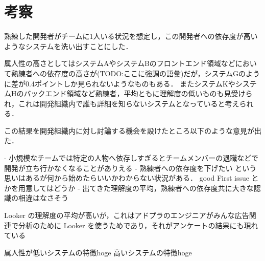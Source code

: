 \section{考察}

熟練した開発者がチームに1人いる状況を想定し，この開発者への依存度が高いようなシステムを洗い出すことにした．



属人性の高さとしてはシステムAやシステムBのフロントエンド領域などにおいて熟練者への依存度の高さが(TODO:ここに強調の語彙)だが，システムGのように差が0.4ポイントしか見られないようなものもある．
またシステムKやシステムHのバックエンド領域など熟練者，平均ともに理解度の低いものも見受けられ，これは開発組織内で誰も詳細を知らないシステムとなっていると考えられる．

この結果を開発組織内に対し討論する機会を設けたところ以下のような意見が出た．

- 小規模なチームでは特定の人物へ依存しすぎるとチームメンバーの退職などで開発が立ち行かなくなることがありえる
- 熟練者への依存度を下げたい という思いはあるが何から始めたらいいかわからない状況がある． good First issue とかを用意してはどうか
- 出てきた理解度の平均，熟練者への依存度共に大きな認識の相違はなさそう

Looker の理解度の平均が高いが，これはアドプラのエンジニアがみんな広告関連で分析のために Looker を使うためであり，それがアンケートの結果にも現れている



属人性が低いシステムの特徴hoge
高いシステムの特徴hoge




